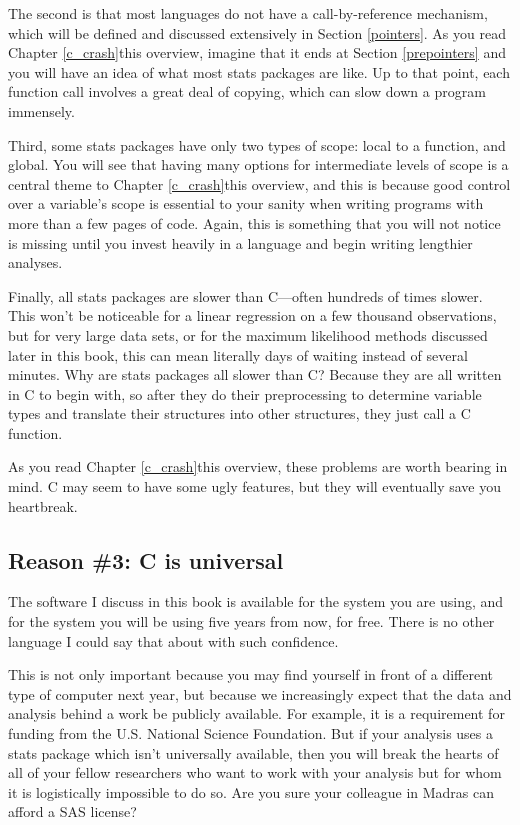 The second is that most languages do not have a call-by-reference
mechanism, which will be defined and discussed extensively in Section
\ref{pointers}. As you read \ifbook Chapter \ref{c_crash}\else this overview\fi, imagine that it ends
at Section \ref{prepointers} and you will have an idea of what most
stats packages are like. Up to that point, each function call involves a
great deal of copying, which can slow down a program immensely.

Third, some stats packages have only two types of scope: local to
a function, and global. You will see that having many options for
intermediate levels of scope is a central theme to \ifbook Chapter \ref{c_crash}\else this overview\fi,
and this is because good control over a variable's scope is essential
to your sanity when writing programs with more than a few pages of
code. Again, this is something that you will not notice is missing until
you invest heavily in a language and begin writing lengthier analyses.

Finally, all stats packages are slower than C---often hundreds of times
slower. This won't be noticeable for a linear regression on a few thousand
observations, but for very large data sets, or for the maximum likelihood
methods discussed later in this book, this can mean literally days of
waiting instead of several minutes.  Why are stats packages all slower
than C? Because they are all written in C to begin with, so after they
do their preprocessing to determine variable types and translate their
structures into other structures, they just call a C function.

As you read \ifbook Chapter \ref{c_crash}\else this overview\fi, these
problems are worth bearing in mind. C may seem to have some ugly
features, but they will eventually save you heartbreak.

\subsection{Reason \#3: C is universal} 
The software I discuss in this book is available for the system you
are using, and for the system you will be using five years from now,
for free. There is no other language I could say that about with such
confidence.

This is not only important because you may find yourself in front of
a different type of computer next year, but because we increasingly
expect that the data and analysis behind a work be publicly available.
For example, it is a requirement for funding from the U.S. National
Science Foundation. But if your analysis uses a stats package which
isn't universally available, then you will break the hearts of all of
your fellow researchers who want to work with your analysis but for whom
it is logistically impossible to do so. Are you sure your colleague in
Madras can afford a SAS license?

